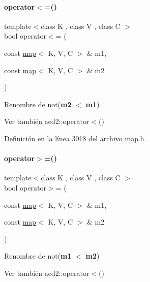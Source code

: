 \paragraph{\texorpdfstring{operator$<$=()}{operator<=()}}
{\footnotesize\ttfamily template$<$class K , class V , class C $>$ \\
bool operator$<$= (\begin{DoxyParamCaption}\item[{const \hyperlink{classaed2_1_1map}{map}$<$ K, V, C $>$ \&}]{m1,  }\item[{const \hyperlink{classaed2_1_1map}{map}$<$ K, V, C $>$ \&}]{m2 }\end{DoxyParamCaption})\hspace{0.3cm}{\ttfamily [related]}}



Renombre de not({\bfseries m2} $<$ {\bfseries m1}) 

\begin{DoxySeeAlso}{Ver también}
aed2\+::operator$<$() 
\end{DoxySeeAlso}


Definición en la línea \hyperlink{map_8h_source_l03018}{3018} del archivo \hyperlink{map_8h_source}{map.\+h}.

\mbox{\label{classaed2_1_1map_a093a6d1a055339c5fc6297a1d47a9159_a093a6d1a055339c5fc6297a1d47a9159}} 
\paragraph{\texorpdfstring{operator$>$=()}{operator>=()}}
{\footnotesize\ttfamily template$<$class K , class V , class C $>$ \\
bool operator$>$= (\begin{DoxyParamCaption}\item[{const \hyperlink{classaed2_1_1map}{map}$<$ K, V, C $>$ \&}]{m1,  }\item[{const \hyperlink{classaed2_1_1map}{map}$<$ K, V, C $>$ \&}]{m2 }\end{DoxyParamCaption})\hspace{0.3cm}{\ttfamily [related]}}



Renombre de not({\bfseries m1} $<$ {\bfseries m2}) 

\begin{DoxySeeAlso}{Ver también}
aed2\+::operator$<$() 
\end{DoxySeeAlso}


